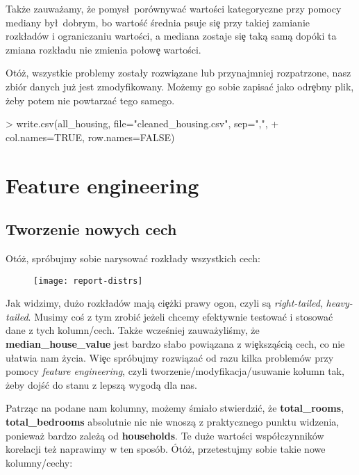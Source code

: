 \documentclass{article}
\begin{document}
\noindent
\quad Także zauważamy, że pomys\l\ porównywa\'c wartości kategoryczne przy pomocy mediany by\l\ dobrym, bo wartoś\'c średnia psuje si\c e przy takiej zamianie rozk\l adów i ograniczaniu wartości, a mediana zostaje si\c e taką samą dopóki ta zmiana rozk\l adu nie zmienia po\l ow\c e wartości.

\noindent
\quad Otóż, wszystkie problemy zosta\l y rozwiązane lub przynajmniej rozpatrzone, nasz zbiór danych już jest zmodyfikowany. Możemy go sobie zapisa\'c jako odr\c ebny plik, żeby potem nie powtarza\'c tego samego.

\begin{Schunk}
\begin{Sinput}
> write.csv(all_housing, file="cleaned_housing.csv", sep=",", 
+           col.names=TRUE, row.names=FALSE)
\end{Sinput}
\end{Schunk}

\section{Feature engineering}
\subsection{Tworzenie nowych cech}

\noindent
\quad Otóż, spróbujmy sobie narysowa\'c rozk\l ady wszystkich cech:

\begin{figure}[h!]
\centering
\texttt{[image: report-distrs]}
\end{figure}

\noindent
\quad Jak widzimy, dużo rozk\l adów mają ci\c eżki prawy ogon, czyli są \textit{right-tailed}, \textit{heavy-tailed}. Musimy coś z tym zrobi\'c jeżeli chcemy efektywnie testowa\'c i stosowa\'c dane z tych kolumn/cech. Także wcześniej zauważyliśmy, że \textbf{median\_house\_value} jest bardzo s\l abo powiązana z wi\c eksząścią cech, co nie u\l atwia nam życia. Wi\c ec spróbujmy rozwiąza\'c od razu kilka problemów przy pomocy \textit{feature engineering}, czyli tworzenie/modyfikacja/usuwanie kolumn tak, żeby dojś\'c do stanu z lepszą wygodą dla nas.

\noindent
\quad Patrząc na podane nam kolumny, możemy śmia\l o stwierdzi\'c, że \textbf{total\_rooms}, \textbf{total\_bedrooms} absolutnie nic nie wnoszą z praktycznego punktu widzenia, ponieważ bardzo zależą od \textbf{households}. Te duże wartości wspó\l czynników korelacji też naprawimy w ten sposób. Ótóż, przetestujmy sobie takie nowe kolumny/cechy:
\end{document}
